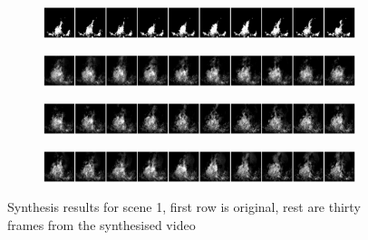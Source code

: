 \documentclass{article}
\begin{document}
\begin{figure}
	\centering
	\begin{subfigure}{\textwidth}
		\includegraphics[width=\textwidth]{visuals/Underconstrained_flicker_g1_c4_f10.png}
	\end{subfigure}
	\begin{subfigure}{\textwidth}
		\includegraphics[width=\textwidth]{visuals/Underconstrained_flicker_g1_c4_s0_synth.png}
	\end{subfigure}
	\begin{subfigure}{\textwidth}
		\includegraphics[width=\textwidth]{visuals/Underconstrained_flicker_g1_c4_s10_synth.png}
	\end{subfigure}
	\begin{subfigure}{\textwidth}
		\includegraphics[width=\textwidth]{visuals/Underconstrained_flicker_g1_c4_s20_synth.png}
	\end{subfigure}
	\caption{Synthesis results for scene 1, first row is original, rest are thirty frames from the synthesised video}
	\label{fig:synthesis-1}
\end{figure}
\end{document}
